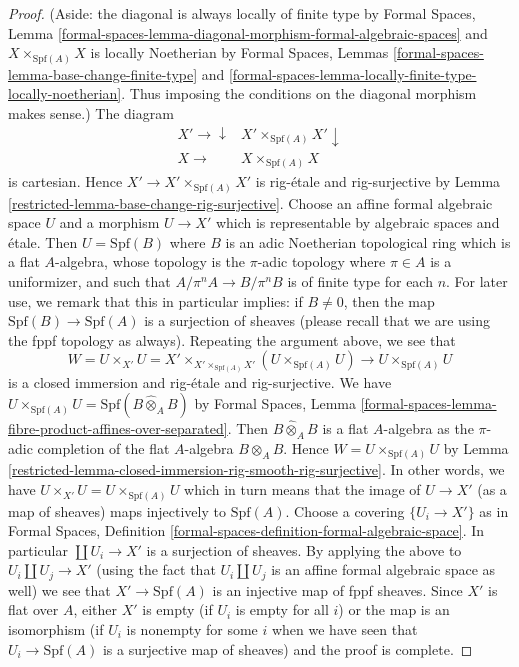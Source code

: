 \begin{proof}

(Aside: the diagonal is always locally of finite type by
Formal Spaces, Lemma
\ref{formal-spaces-lemma-diagonal-morphism-formal-algebraic-spaces}
and $X \times_{\text{Spf}(A)} X$ is locally Noetherian by
Formal Spaces, Lemmas
\ref{formal-spaces-lemma-base-change-finite-type} and
\ref{formal-spaces-lemma-locally-finite-type-locally-noetherian}.
Thus imposing the conditions on the diagonal morphism makes sense.)
The diagram
$$
\begin{array}{cc}X' \longrightarrow\downarrow & X' \times_{\text{Spf}(A)} X' \downarrow \\ X \longrightarrow & X \times_{\text{Spf}(A)} X\end{array}
$$
is cartesian. Hence $X' \to X' \times_{\text{Spf}(A)} X'$
is rig-\'etale and rig-surjective by
Lemma \ref{restricted-lemma-base-change-rig-surjective}.
Choose an affine formal algebraic space $U$ and a morphism
$U \to X'$ which is representable by algebraic spaces and \'etale.
Then $U = \text{Spf}(B)$ where $B$ is an adic Noetherian topological ring
which is a flat $A$-algebra, whose topology is the $\pi$-adic
topology where $\pi \in A$ is a uniformizer, and such that
$A/\pi^n A \to B/\pi^n B$ is of finite type for each $n$.
For later use, we remark that this in particular implies: if $B \not = 0$,
then the map $\text{Spf}(B) \to \text{Spf}(A)$ is a surjection
of sheaves (please recall that we are using the fppf topology
as always). Repeating the argument above, we see that
$$
W = U \times_{X'} U =
X' \times_{X' \times_{\text{Spf}(A)} X'} (U \times_{\text{Spf}(A)} U)
\longrightarrow
U \times_{\text{Spf}(A)} U
$$
is a closed immersion and rig-\'etale and rig-surjective. We have
$U \times_{\text{Spf}(A)} U = \text{Spf}(B \widehat{\otimes}_A B)$
by Formal Spaces, Lemma
\ref{formal-spaces-lemma-fibre-product-affines-over-separated}.
Then $B \widehat{\otimes}_A B$ is a flat $A$-algebra
as the $\pi$-adic completion of the flat $A$-algebra $B \otimes_A B$.
Hence $W = U \times_{\text{Spf}(A)} U$ by
Lemma \ref{restricted-lemma-closed-immersion-rig-smooth-rig-surjective}.
In other words, we have $U \times_{X'} U = U \times_{\text{Spf}(A)} U$
which in turn means that the image of $U \to X'$ (as a map of sheaves)
maps injectively to $\text{Spf}(A)$.
Choose a covering $\{U_i \to X'\}$ as in Formal Spaces, Definition
\ref{formal-spaces-definition-formal-algebraic-space}.
In particular $\coprod U_i \to X'$ is a surjection of sheaves.
By applying the above to $U_i \coprod U_j \to X'$ (using the
fact that $U_i \amalg U_j$ is an affine formal algebraic space
as well) we see that $X' \to \text{Spf}(A)$ is an injective map
of fppf sheaves. Since $X'$ is flat over $A$, either $X'$ is empty
(if $U_i$ is empty for all $i$) or the map is an isomorphism
(if $U_i$ is nonempty for some $i$ when we have seen that
$U_i \to \text{Spf}(A)$ is a surjective map of sheaves)
and the proof is complete.
\end{proof}

